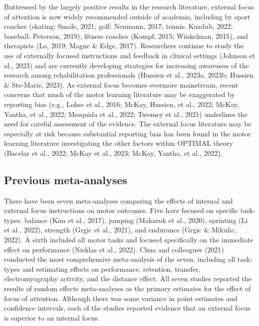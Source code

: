 \documentclass[
  11pt,
  doc, donotrepeattitle,floatsintext]{apa7}
\begin{document}
Buttressed by the largely positive results in the research literature, external focus of attention is now widely recommended outside of academia, including by sport coaches (skating: Smale, 2021; golf: Neumann, 2017; tennis: Kuzdub, 2022; baseball: Peterson, 2019), fitness coaches (Kompf, 2015; Winkelman, 2015), and therapists (Lo, 2019; Magne \& Edge, 2017). Researchers continue to study the use of externally focused instructions and feedback in clinical settings (Johnson et al., 2023) and are currently developing strategies for increasing awareness of the research among rehabilitation professionals (Hussien et al., 2023a, 2023b; Hussien \& Ste-Marie, 2023). As external focus becomes evermore mainstream, recent concerns that much of the motor learning literature may be exaggerated by reporting bias (e.g., Lohse et al., 2016; McKay, Hussien, et al., 2022; McKay, Yantha, et al., 2022; Mesquida et al., 2022; Twomey et al., 2021) underlines the need for careful assessment of the evidence. The external focus literature may be especially at risk because substantial reporting bias has been found in the motor learning literature investigating the other factors within OPTIMAL theory (Bacelar et al., 2022; McKay et al., 2023; McKay, Yantha, et al., 2022).

\hypertarget{previous-meta-analyses}{%
\subsection{Previous meta-analyses}\label{previous-meta-analyses}}

There have been seven meta-analyses comparing the effects of internal and external focus instructions on motor outcomes. Five have focused on specific task-types: balance (Kim et al., 2017), jumping (Makaruk et al., 2020), sprinting (Li et al., 2022), strength (Grgic et al., 2021), and endurance (Grgic \& Mikulic, 2022). A sixth included all motor tasks and focused specifically on the immediate effect on performance (Nicklas et al., 2022). Chua and colleagues (2021) conducted the most comprehensive meta-analysis of the seven, including all task-types and estimating effects on performance, retention, transfer, electromyography activity, and the distance effect. All seven studies reported the results of random effects meta-analyses as the primary estimates for the effect of focus of attention. Although there was some variance in point estimates and confidence intervals, each of the studies reported evidence that an external focus is superior to an internal focus.
\end{document}
